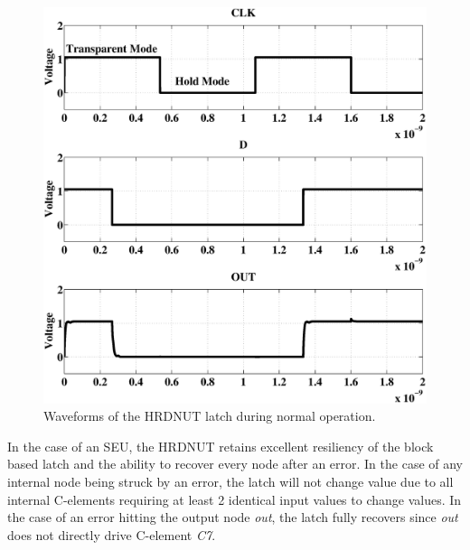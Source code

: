 \begin{figure}[!htbp]
	\centering
	\includegraphics[width=0.80\linewidth]{Figures/defaultoperation.eps}
	\caption{Waveforms of the HRDNUT latch during normal operation.}
	\label{NormOp}
\end{figure}

In the case of an SEU, the HRDNUT retains excellent resiliency of the block based latch and the ability to recover every node after an error. In the case of any internal node being struck by an error, the latch will not change value due to all internal C-elements requiring at least 2 identical input values to change values. In the case of an error hitting the output node \textit{out}, the latch fully recovers since \textit{out} does not directly drive C-element \textit{C7}.

